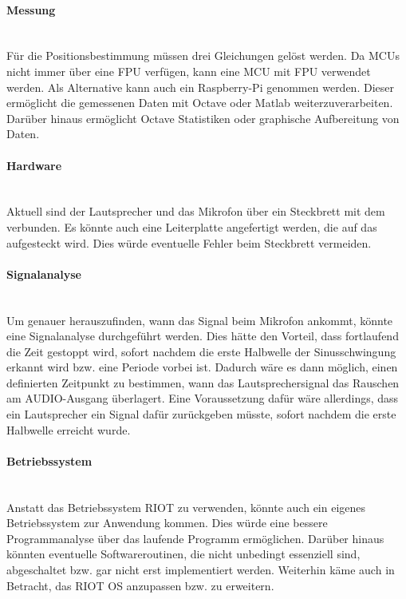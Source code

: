 \paragraph{Messung}\mbox{}\\
Für die Positionsbestimmung müssen drei Gleichungen gelöst werden. Da MCUs nicht immer über eine FPU verfügen, kann eine MCU mit FPU verwendet werden. Als Alternative kann auch ein Raspberry-Pi genommen werden. Dieser ermöglicht die gemessenen Daten mit Octave oder Matlab weiterzuverarbeiten. Darüber hinaus ermöglicht Octave Statistiken oder graphische Aufbereitung von Daten.

\paragraph{Hardware}\mbox{}\\
Aktuell sind der Lautsprecher und das Mikrofon über ein Steckbrett mit dem \board \platz verbunden. Es könnte auch eine Leiterplatte angefertigt werden, die auf das \board \platz aufgesteckt wird. Dies würde eventuelle Fehler beim Steckbrett vermeiden.

\paragraph{Signalanalyse}\mbox{}\\
Um genauer herauszufinden, wann das Signal beim Mikrofon ankommt, könnte eine Signalanalyse durchgeführt werden. Dies hätte den Vorteil, dass fortlaufend die Zeit gestoppt wird, sofort nachdem die erste Halbwelle der Sinusschwingung erkannt wird bzw. eine Periode vorbei ist. Dadurch wäre es dann möglich, einen definierten Zeitpunkt zu bestimmen, wann das Lautsprechersignal das Rauschen am \si{AUDIO}-Ausgang überlagert. Eine Voraussetzung dafür wäre allerdings, dass ein Lautsprecher ein Signal dafür zurückgeben müsste, sofort nachdem die erste Halbwelle erreicht wurde.

\paragraph{Betriebssystem}\mbox{}\\
Anstatt das Betriebssystem RIOT zu verwenden, könnte auch ein eigenes Betriebssystem zur Anwendung kommen. Dies würde eine bessere Programmanalyse über das laufende Programm ermöglichen. Darüber hinaus könnten eventuelle Softwareroutinen, die nicht unbedingt essenziell sind, abgeschaltet bzw. gar nicht erst implementiert werden. Weiterhin käme auch in Betracht, das RIOT OS anzupassen bzw. zu erweitern.

